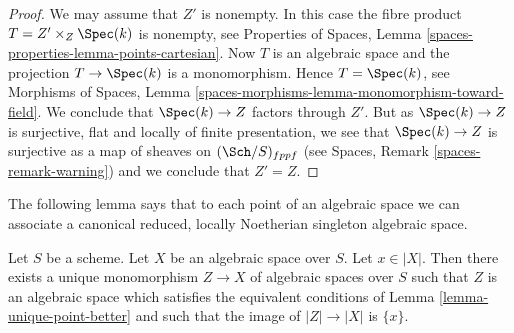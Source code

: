 \begin{proof}
We may assume that $Z'$ is nonempty. In this case the
fibre product $T = Z' \times_Z \Spec(k)$
is nonempty, see
Properties of Spaces, Lemma \ref{spaces-properties-lemma-points-cartesian}.
Now $T$ is an algebraic space and the projection $T \to \Spec(k)$
is a monomorphism. Hence $T = \Spec(k)$, see
Morphisms of Spaces, Lemma
\ref{spaces-morphisms-lemma-monomorphism-toward-field}.
We conclude that $\Spec(k) \to Z$ factors through $Z'$.
But as $\Spec(k) \to Z$ is surjective, flat and locally of finite
presentation, we see that $\Spec(k) \to Z$ is surjective as a
map of sheaves on $(\Sch/S)_{fppf}$ (see
Spaces, Remark \ref{spaces-remark-warning})
and we conclude that $Z' = Z$.
\end{proof}

\noindent
The following lemma says that to each point of an algebraic space we
can associate a canonical reduced, locally Noetherian singleton
algebraic space.

\begin{lemma}
\label{lemma-find-singleton-from-point}
Let $S$ be a scheme. Let $X$ be an algebraic space over $S$.
Let $x \in |X|$. Then there exists a unique monomorphism
$Z \to X$ of algebraic spaces
over $S$ such that $Z$ is an algebraic space which satisfies the equivalent
conditions of
Lemma \ref{lemma-unique-point-better}
and such that the image of $|Z| \to |X|$ is $\{x\}$.
\end{lemma}


